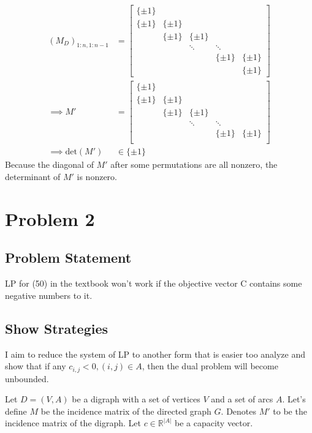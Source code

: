 \documentclass[]{article}
\theoremstyle{definition}
\begin{document}
        \begin{align}
            (M_D)_{1:n, 1:n - 1} &= \begin{bmatrix}
                \{\pm 1\} &   & & \\
                \{\pm 1\} & \{\pm 1\} & & \\
                  & \{\pm 1\} & \{\pm 1\} & \\
                  & & \ddots  &  \ddots\\
                  & & & \{\pm 1\} & \{\pm 1\} \\
                  & & &  & \{\pm 1\}
            \end{bmatrix}
            \\
            \implies 
            M' &= \begin{bmatrix}
                \{\pm 1\} &   & & \\
                \{\pm 1\} & \{\pm 1\} & & \\
                  & \{\pm 1\} & \{\pm 1\} & \\
                  & & \ddots  &  \ddots\\
                  & & & \{\pm 1\} & \{\pm 1\} \\
            \end{bmatrix}
            \\
            \implies \text{det}(M') &\in \{\pm 1\}
        \end{align}
        Because the diagonal of $M'$ after some permutations are all nonzero, the determinant of $M'$ is nonzero. 
\section{Problem 2}
    \subsection{Problem Statement}
        LP for (50) in the textbook won't work if the objective vector C contains some negative numbers to it. 
    \subsection{Show Strategies}
        I aim to reduce the system of LP to another form that is easier too analyze and show that if any $c_{i, j} < 0, (i, j)\in A$, then the dual problem will become unbounded. 
        \par
        Let $D = (V, A)$ be a digraph with a set of vertices $V$ and a set of arcs $A$. Let's define $M$ be the incidence matrix of the directed graph $G$. Denotes $M'$ to be the incidence matrix of the digraph. Let $c\in \mathbb R^{|A|}$ be a capacity vector. 
\end{document}
